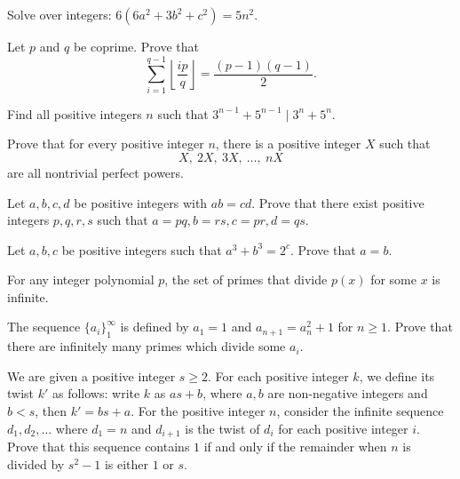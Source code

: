 \begin{problem}{\label{p:i:n:pr:8}}
  Solve over integers: $6(6a^2 + 3b^2 + c^2) = 5n^2$.
\end{problem}
\begin{problem}{\label{p:i:n:pr:9}}
  Let $p$ and $q$ be coprime. Prove that
      \[\sum_{i=1}^{q-1}\left\lfloor\frac{ip}{q}\right\rfloor=\frac{(p-1)(q-1)}2.\]
\end{problem}
\begin{problem}{\label{p:i:n:pr:9b}}
        Find all positive integers $n$ such that $3^{n-1}+5^{n-1}\mid
      3^n+5^n$.
\end{problem}
\begin{problem}{\label{p:i:n:pr:10}}
  Prove that for every positive integer $n$, there is a positive integer
    $X$ such that \[X,\ 2X,\ 3X,\ \ldots,\ nX\] are all nontrivial perfect powers.
\end{problem}
\begin{problem}{\label{p:i:n:pr:10b}}
      Let $a,b,c,d$ be positive integers with $ab=cd$. Prove that there
      exist positive integers $p,q,r,s$ such that \(a=pq,b=rs,c=pr,d=qs\).
\end{problem}
\begin{problem}{\label{p:i:n:pr:11}}
Let $a,b,c$ be positive integers such that $a^3+b^3=2^c$. Prove that
      $a=b$.
\end{problem}
\begin{result}{\label{r:i:n:pr:5}}
  For any integer polynomial $p$, the
    set of primes that divide $p(x)$ for some $x$ is infinite.
\end{result}
\begin{problem}{\label{p:i:n:pr:12}}
  The sequence $\{a_i\}_1^\infty$ is defined by $a_1 = 1$ and
    $a_{n+1}=a_n^2+1$ for $n\ge 1$. Prove that there are infinitely many primes
    which divide some $a_i$.
\end{problem}
\begin{problem}{\label{p:i:n:pr:13}}
    We are given a positive integer $s \ge 2$. For each positive integer
    $k$, we define its twist $k'$ as follows: write $k$ as $as+b$, where $a, b$
    are non-negative integers and $b < s$, then $k' = bs+a$. For the positive
    integer $n$, consider the infinite sequence $d_1, d_2, \dots$ where $d_1=n$
    and $d_{i+1}$ is the twist of $d_i$ for each positive integer $i$.
    Prove that this sequence contains $1$ if and only if the remainder when $n$
    is divided by $s^2-1$ is either $1$ or $s$.
\end{problem}
